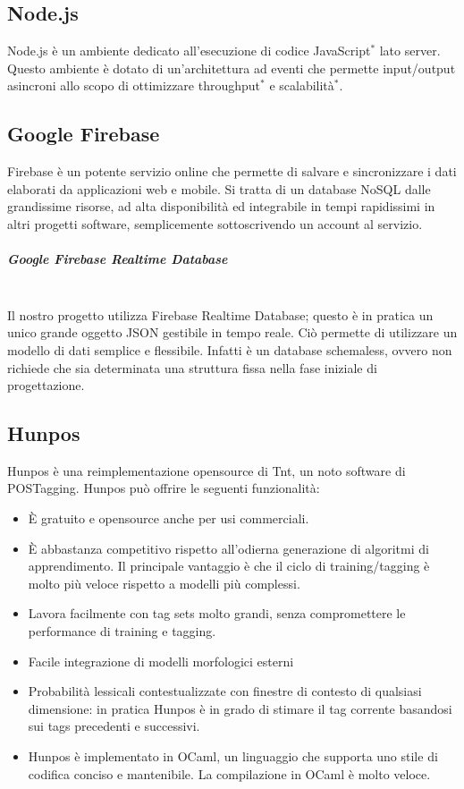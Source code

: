 \subsection{Node.js}
Node.js è un ambiente dedicato all'esecuzione di codice JavaScript$^*$ lato server. Questo ambiente è dotato di un'architettura ad eventi che permette input/output asincroni allo scopo di ottimizzare throughput$^*$ e scalabilità$^*$.
\subsection{Google Firebase}
Firebase è un potente servizio online che permette di salvare e sincronizzare i dati elaborati da applicazioni web e mobile. Si tratta di un database NoSQL dalle grandissime risorse, ad alta disponibilità ed integrabile in tempi rapidissimi in altri progetti software, semplicemente sottoscrivendo un account al servizio.

\subparagraph{Google Firebase Realtime Database}
 \noindent \\Il nostro progetto utilizza Firebase Realtime Database; questo è in pratica un unico grande oggetto JSON gestibile in tempo reale. Ciò permette di utilizzare un modello di dati semplice e flessibile. Infatti è un database schemaless, ovvero non richiede che sia determinata una struttura fissa nella fase iniziale di progettazione. 
\subsection{Hunpos}
Hunpos è una reimplementazione opensource di Tnt, un noto software di POSTagging.
Hunpos può offrire le seguenti funzionalità:
\begin{itemize}
\item È gratuito e opensource anche per usi commerciali.

\item È abbastanza competitivo rispetto all'odierna generazione di algoritmi di apprendimento. Il principale vantaggio è che il ciclo di training/tagging è molto più veloce rispetto a modelli più complessi.

\item Lavora facilmente con tag sets molto grandi,
senza compromettere le performance di training e tagging.

\item Facile integrazione di modelli morfologici esterni

\item Probabilità lessicali contestualizzate con finestre di contesto di qualsiasi dimensione: in pratica Hunpos è in grado di stimare il tag corrente basandosi sui tags precedenti e successivi.

\item Hunpos è implementato in OCaml, un linguaggio che supporta uno stile di codifica conciso e mantenibile. La compilazione in OCaml è molto veloce.
\end{itemize}
